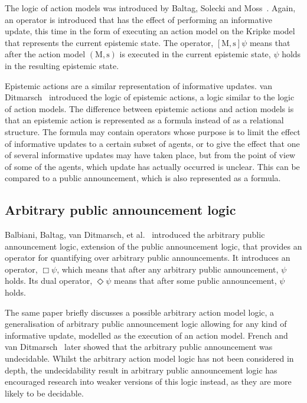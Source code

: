 The logic of action models was introduced by Baltag, Solecki and
Moss~\cite{baltag2004logics}. Again, an operator is introduced that has the
effect of performing an informative update, this time in the form of executing
an action model on the Kripke model that represents the current epistemic
state.  The operator, $[\mathrm{M,s}]\psi$ means that after the action model
$(\mathrm{M, s})$ is executed in the current epistemic state, $\psi$ holds in
the resulting epistemic state. 

Epistemic actions are a similar representation of informative updates.
van
Ditmarsch~\cite{vanditmarsch1999logic,vanditmarsch2001knowledge,vanditmarsch2007dynamic}
introduced the logic of epistemic actions, a logic similar to the logic of
action models. The difference between epistemic actions and action models is
that an epistemic action is represented as a formula instead of as a relational
structure. The formula may contain operators whose purpose is to limit the
effect of informative updates to a certain subset of agents, or to give the
effect that one of several informative updates may have taken place, but from
the point of view of some of the agents, which update has actually occurred is
unclear. This can be compared to a public announcement, which is also
represented as a formula.

\subsection{Arbitrary public announcement logic}

Balbiani, Baltag, van Ditmarsch, et al.~\cite{balbiani2007arbitrary} introduced
the arbitrary public announcement logic, extension of the public announcement
logic, that provides an operator for quantifying over arbitrary public
announcements. It introduces an operator, $\Box\psi$, which means that after
any arbitrary public announcement, $\psi$ holds. Its dual operator,
$\Diamond\psi$ means that after some public announcement, $\psi$ holds.

The same paper briefly discusses a possible arbitrary action model logic, a
generalisation of arbitrary public announcement logic allowing for any kind of
informative update, modelled as the execution of an action model. French and
van Ditmarsch~\cite{french2008undecidability} later showed that the arbitrary
public announcement was undecidable. Whilst the arbitrary action model logic has
not been considered in depth, the undecidability result in arbitrary public
announcement logic has encouraged research into weaker versions of this logic
instead, as they are more likely to be decidable.

